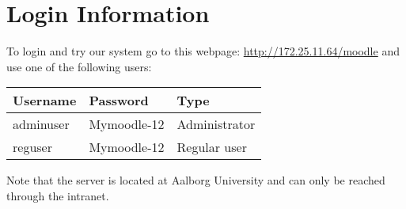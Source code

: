 \chapter{Login Information}
\label{app:logininfo}
To login and try our system go to this webpage:
\url{http://172.25.11.64/moodle}
and use one of the following users:

\begin{center}
	\begin{tabular}{|l|l|l|}
		\hline
		\textbf{Username} & \textbf{Password} & \textbf{Type} \\
		\hline
		adminuser & Mymoodle-12 & Administrator \\
		\hline
		reguser   & Mymoodle-12 & Regular user \\
		\hline
	\end{tabular}
\end{center}

Note that the server is located at Aalborg University and can only be reached through the intranet.